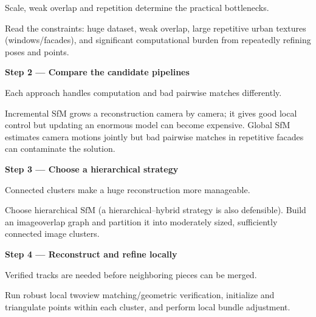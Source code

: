 \documentclass[letterpaper,11pt,english,openany,oneside]{jupyterBook}
\begin{document}
\sphinxAtStartPar
{} Scale, weak overlap and repetition determine the practical bottlenecks.

\sphinxAtStartPar
Read the constraints: huge dataset, weak overlap, large repetitive urban textures (windows/facades), and significant computational burden from repeatedly refining poses and points.

\par

\par\medskip{}
{\color{QuizStepRed}\bfseries Step 2 — Compare the candidate pipelines}\par\smallskip

\sphinxAtStartPar
{} Each approach handles computation and bad pairwise matches differently.

\sphinxAtStartPar
Incremental SfM grows a reconstruction camera by camera; it gives good local control but updating an enormous model can become expensive. Global SfM estimates camera motions jointly but bad pairwise matches in repetitive facades can contaminate the solution.

\par

\par\medskip{}
{\color{QuizStepRed}\bfseries Step 3 — Choose a hierarchical strategy}\par\smallskip

\sphinxAtStartPar
{} Connected clusters make a huge reconstruction more manageable.

\sphinxAtStartPar
Choose {\color{QuizMathBlue} \(\boxed{\text{hierarchical SfM}}\)} (a hierarchical–hybrid strategy is also defensible). Build an image\sphinxhyphen{}overlap graph and partition it into moderately sized, sufficiently connected image clusters.

\par

\par\medskip{}
{\color{QuizStepRed}\bfseries Step 4 — Reconstruct and refine locally}\par\smallskip

\sphinxAtStartPar
{} Verified tracks are needed before neighboring pieces can be merged.

\sphinxAtStartPar
Run robust local two\sphinxhyphen{}view matching/geometric verification, initialize and triangulate points within each cluster, and perform local bundle adjustment.
\end{document}
